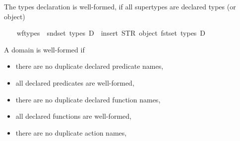 \begin{isabellebody}
\begin{isamarkuptext}
The types declaration is well-formed, if all supertypes are declared types (or object)%
\end{isamarkuptext}\isamarkuptrue%
\ \ \isamarkupfalse%
\ {\isachardoublequoteopen}wf{\isacharunderscore}{\kern0pt}types\ {\isasymequiv}\ snd{\isacharbackquote}{\kern0pt}set\ {\isacharparenleft}{\kern0pt}types\ D{\isacharparenright}{\kern0pt}\ {\isasymsubseteq}\ insert\ {\isacharparenleft}{\kern0pt}STR\ {\isacharprime}{\kern0pt}{\isacharprime}{\kern0pt}object{\isacharprime}{\kern0pt}{\isacharprime}{\kern0pt}{\isacharparenright}{\kern0pt}\ {\isacharparenleft}{\kern0pt}fst{\isacharbackquote}{\kern0pt}set\ {\isacharparenleft}{\kern0pt}types\ D{\isacharparenright}{\kern0pt}{\isacharparenright}{\kern0pt}{\isachardoublequoteclose}%
\begin{isamarkuptext}%
A domain is well-formed if

%
\begin{itemize}%
\item there are no duplicate declared predicate names,

\item all declared predicates are well-formed,

\item there are no duplicate declared function names,

\item all declared functions are well-formed,

\item there are no duplicate action names,


\end{itemize}
\end{isamarkuptext}
\end{isabellebody}
